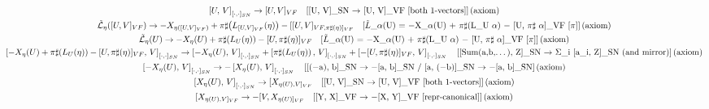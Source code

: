 \documentclass[11pt]{article}
\newcommand{\prompt}[4]{
        {\ttfamily\llap{{\color{#2}[#3]:\hspace{3pt}#4}}\vspace{-\baselineskip}}
    }
\begin{document}
    \begin{Verbatim}[commandchars=\\\{\}]

    \end{Verbatim}
 
            
\prompt{Out}{outcolor}{6}{}
    
    {\allowdisplaybreaks\scriptsize
\begin{gather*}
\left[U,\, V\right]_{[\cdot,\cdot]_{SN}} \to [U,V]_{VF} \quad \text{[[U, V]\_SN \ensuremath{\to} [U, V]\_VF  [both 1-vectors]]\,(axiom)} \\
\tilde{\mathcal{L}}_{\eta}\!\left([U,V]_{VF}\right) \to -X_{\eta([U,V]_{VF})} + \pi\sharp\!\left(L_{[U,V]_{VF}}\!\left(\eta\right)\right) - [[U,V]_{VF,\pi\sharp(\eta)]_{VF}} \quad \text{[\ensuremath{\tilde{L}}\_\ensuremath{\alpha}(U) = \ensuremath{-}X\_{\ensuremath{\alpha}(U)} + \ensuremath{\pi}\ensuremath{\sharp}(L\_U \ensuremath{\alpha}) \ensuremath{-} [U, \ensuremath{\pi}\ensuremath{\sharp} \ensuremath{\alpha}]\_VF [\ensuremath{\pi}]]\,(axiom)} \\
\tilde{\mathcal{L}}_{\eta}\!\left(U\right) \to -X_\eta(U) + \pi\sharp\!\left(L_U\!\left(\eta\right)\right) - [U,\pi\sharp(\eta)]_{VF} \quad \text{[\ensuremath{\tilde{L}}\_\ensuremath{\alpha}(U) = \ensuremath{-}X\_{\ensuremath{\alpha}(U)} + \ensuremath{\pi}\ensuremath{\sharp}(L\_U \ensuremath{\alpha}) \ensuremath{-} [U, \ensuremath{\pi}\ensuremath{\sharp} \ensuremath{\alpha}]\_VF [\ensuremath{\pi}]]\,(axiom)} \\
\left[-X_\eta(U) + \pi\sharp\!\left(L_U\!\left(\eta\right)\right) - [U,\pi\sharp(\eta)]_{VF},\, V\right]_{[\cdot,\cdot]_{SN}} \to \left[-X_\eta(U),\, V\right]_{[\cdot,\cdot]_{SN}} + \left[\pi\sharp\!\left(L_U\!\left(\eta\right)\right),\, V\right]_{[\cdot,\cdot]_{SN}} + \left[-[U,\pi\sharp(\eta)]_{VF},\, V\right]_{[\cdot,\cdot]_{SN}} \quad \text{[[Sum(a,b,\ensuremath{\dots}), Z]\_SN \ensuremath{\to} \ensuremath{\Sigma}\_i [a\_i, Z]\_SN  (and mirror)]\,(axiom)} \\
\left[-X_\eta(U),\, V\right]_{[\cdot,\cdot]_{SN}} \to -\left[X_\eta(U),\, V\right]_{[\cdot,\cdot]_{SN}} \quad \text{[[(\ensuremath{-}a), b]\_SN \ensuremath{\to} \ensuremath{-}[a, b]\_SN  /  [a, (\ensuremath{-}b)]\_SN \ensuremath{\to} \ensuremath{-}[a, b]\_SN]\,(axiom)} \\
\left[X_\eta(U),\, V\right]_{[\cdot,\cdot]_{SN}} \to [X_{\eta(U),V]_{VF}} \quad \text{[[U, V]\_SN \ensuremath{\to} [U, V]\_VF  [both 1-vectors]]\,(axiom)} \\
[X_{\eta(U),V]_{VF}} \to -[V,X_{\eta(U)]_{VF}} \quad \text{[[Y, X]\_VF \ensuremath{\to} \ensuremath{-}[X, Y]\_VF  [repr-canonical]]\,(axiom)} \\

\end{gather*}}
\end{document}
